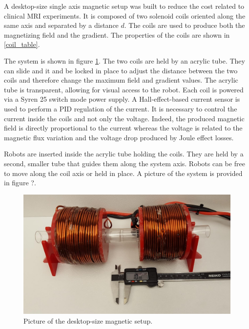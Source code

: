 \documentclass[letterpaper, 10 pt, conference]{ieeeconf}  %
\begin{document}
A desktop-size single axis magnetic setup was built to reduce the cost related to clinical MRI experiments. It is composed of two solenoid coils oriented along the same axis and separated by a distance $d$. The coils are used to produce both the magnetizing field and the gradient. The properties of the coils are shown in \cref{coil_table}.\par
The system is shown in figure \cref{magnetic_setup}. The two coils are held by an acrylic tube. They can slide and it and be locked in place to adjust the distance between the two coils and therefore change the maximum field and gradient values. The acrylic tube is transparent, allowing for visual access to the robot.
Each coil is powered via a Syren 25 switch mode power supply. A Hall-effect-based current sensor is used to perform a PID regulation of the current. It is necessary to control the current inside the coils and not only the voltage. Indeed, the produced magnetic field is directly proportional to the current whereas the voltage is related to the magnetic flux variation and the voltage drop produced by Joule effect losses.\par
Robots are inserted inside the acrylic tube holding the coils. They are held by a second, smaller tube that guides them along the system axis. Robots can be free to move along the coil axis or held in place. A picture of the system is provided in figure ?.

\begin{figure}
  \includegraphics[width=\linewidth]{Magnetic_setup.jpg}
  \caption{Picture of the desktop-size magnetic setup.}
  \label{magnetic_setup}
\end{figure}
\end{document}
